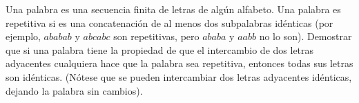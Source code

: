 Una palabra es una secuencia finita de letras de algún alfabeto. Una palabra es repetitiva si es una concatenación de al menos dos subpalabras idénticas (por ejemplo, $ababab$ y $abcabc$ son repetitivas, pero $ababa$ y $aabb$ no lo son). Demostrar que si una palabra tiene la propiedad de que el intercambio de dos letras adyacentes cualquiera hace que la palabra sea repetitiva, entonces todas sus letras son idénticas. (Nótese que se pueden intercambiar dos letras adyacentes idénticas, dejando la palabra sin cambios).
